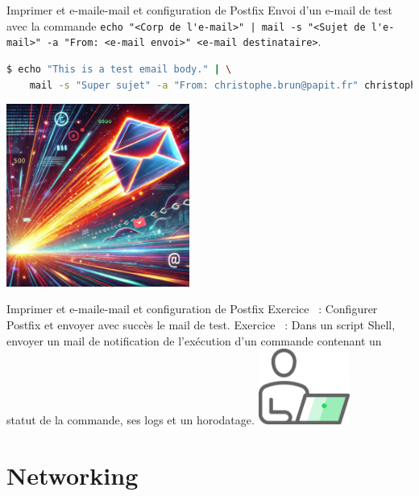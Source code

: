 \documentclass{beamer}
\begin{document}
    \begin{frame}[fragile]{Imprimer et e-mail}{e-mail et configuration de Postfix}
        Envoi d'un e-mail de test avec la commande \lstinline{echo "<Corp de l'e-mail>" | mail -s "<Sujet de l'e-mail>" -a "From: <e-mail envoi>" <e-mail destinataire>}.
        \begin{lstlisting}[language=bash]
$ echo "This is a test email body." | \
    mail -s "Super sujet" -a "From: christophe.brun@papit.fr" christophe.brun@papit.fr
        \end{lstlisting}
        \begin{center}
            \includegraphics[width=6cm]{image/sendmail}
        \end{center}
    \end{frame}

    \begin{frame}{Imprimer et e-mail}{e-mail et configuration de Postfix}
        Exercice \execcounterdispinc~:
        Configurer Postfix et envoyer avec succès le mail de test.
        \bigbreak
        Exercice \execcounterdispinc~:
        Dans un script Shell, envoyer un mail de notification de l'exécution d'un commande contenant un statut de la commande, ses logs et un horodatage.
        \bigbreak
        \centering
        \includegraphics[width=3cm]{image/guy-in-front-of-desktop}
    \end{frame}


    \section{Networking}\label{sec:networking}
\end{document}
